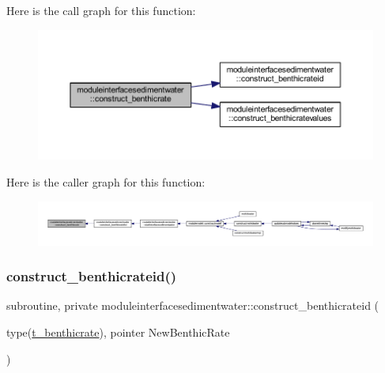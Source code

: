 Here is the call graph for this function\+:\nopagebreak
\begin{figure}[H]
\begin{center}
\leavevmode
\includegraphics[width=350pt]{namespacemoduleinterfacesedimentwater_ab413235c8b7ada790b2fdaa8d3598925_cgraph}
\end{center}
\end{figure}
Here is the caller graph for this function\+:\nopagebreak
\begin{figure}[H]
\begin{center}
\leavevmode
\includegraphics[width=350pt]{namespacemoduleinterfacesedimentwater_ab413235c8b7ada790b2fdaa8d3598925_icgraph}
\end{center}
\end{figure}
\mbox{\label{namespacemoduleinterfacesedimentwater_a079a9bc42bec35aabbd6e236c075228e}} 
\subsubsection{\texorpdfstring{construct\+\_\+benthicrateid()}{construct\_benthicrateid()}}
{\footnotesize\ttfamily subroutine, private moduleinterfacesedimentwater\+::construct\+\_\+benthicrateid (\begin{DoxyParamCaption}\item[{type(\mbox{\hyperlink{structmoduleinterfacesedimentwater_1_1t__benthicrate}{t\+\_\+benthicrate}}), pointer}]{New\+Benthic\+Rate }\end{DoxyParamCaption})\hspace{0.3cm}{\ttfamily [private]}}

